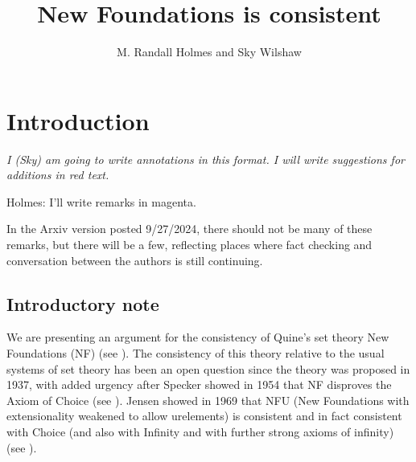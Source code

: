 \documentclass[112pt]{article}
\title{New Foundations is consistent}
\author{M. Randall Holmes and Sky Wilshaw}
\theoremstyle{definition}
\theoremstyle{remark}
\newcommand{\suggest}[1]{{\color{red} #1}}
\newcommand{\hsuggest}[1]{{\color{magenta}#1}}
\newenvironment{annot}{\begin{center}\color{blue}\sl}{\end{center}}
\begin{document}
\maketitle

\tableofcontents

\newpage


\newpage

\section{Introduction}

\begin{annot}
  I (Sky) am going to write annotations in this format.
  I will write suggestions for additions in \suggest{red text}.
\end{annot}

\hsuggest{Holmes: I'll write remarks in magenta.}

\hsuggest{In the Arxiv version posted 9/27/2024, there should not be many of these remarks, but there will be a few, reflecting places where fact checking and conversation between the authors is still continuing.}

\subsection{Introductory note}

We are presenting an argument for the consistency of Quine's set theory New Foundations (NF) (see \cite{nf}).  The consistency of this theory relative to the usual systems of set theory has been an open question since the theory was proposed in 1937, with added urgency after Specker showed in 1954 that NF disproves the Axiom of Choice (see \cite{notac}).
Jensen showed in 1969 that NFU (New Foundations with extensionality weakened to allow urelements) is consistent and in fact consistent with Choice (and also with Infinity and with further strong axioms of infinity) (see \cite{nfu}).
\end{document}
